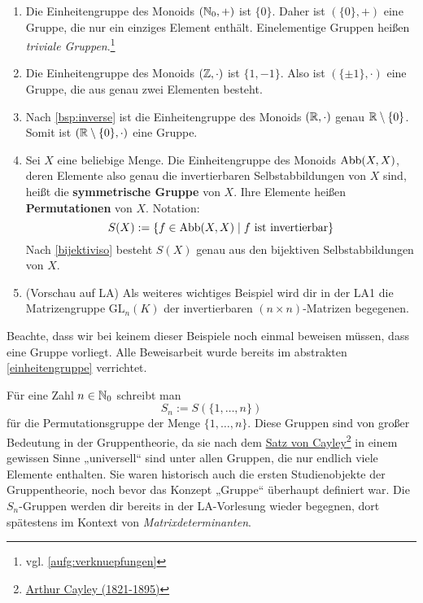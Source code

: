 \begin{bsp}   \quad
    \begin{enumerate}
        \item Die Einheitengruppe des Monoids $(\mathbb N_0,+)$ ist $\{0\}$. Daher ist $(\{0\},+)$ eine Gruppe, die nur ein einziges Element enthält. Einelementige Gruppen heißen \emph{triviale Gruppen}.\footnote{vgl. \cref{aufg:verknuepfungen}}
        \item Die Einheitengruppe des Monoids $(\mathbb Z,\cdot)$ ist $\{1,-1\}$. Also ist $(\{\pm 1\},\cdot)$ eine Gruppe, die aus genau zwei Elementen besteht.
        \item Nach \cref{bsp:inverse} ist die Einheitengruppe des Monoids $(\mathbb R,\cdot)$ genau $\mathbb R\setminus \{0\}$. Somit ist $(\mathbb R\setminus \{0\},\cdot)$ eine Gruppe.
        \item Sei $X$ eine beliebige Menge. Die Einheitengruppe des Monoids $\operatorname{Abb}(X,X)$, deren Elemente also genau die invertierbaren Selbstabbildungen von $X$ sind, heißt die \textbf{symmetrische Gruppe} von $X$. Ihre Elemente heißen \textbf{Permutationen} von $X$. Notation:
            \[ S(X) := \{f\in \Abb(X,X)\mid f\ \text{ist invertierbar} \} \]
        Nach \cref{bijektiviso} besteht $S(X)$ genau aus den bijektiven Selbstabbildungen von $X$.
        \item(Vorschau auf LA) Als weiteres wichtiges Beispiel wird dir in der LA1 die Matrizengruppe $\mathrm{GL}_n(K)$ der invertierbaren $(n\times n)$-Matrizen begegenen.
    \end{enumerate}
    Beachte, dass wir bei keinem dieser Beispiele noch einmal beweisen müssen, dass eine Gruppe vorliegt. Alle Beweisarbeit wurde bereits im abstrakten \cref{einheitengruppe} verrichtet.
\end{bsp}


\begin{bem}
    Für eine Zahl $n\in \mathbb N_0$ schreibt man
        \[ S_n := S(\{1,\dots , n\}) \]
    für die Permutationsgruppe der Menge $\{1,\dots , n\}$. Diese Gruppen sind von großer Bedeutung in der Gruppentheorie, da sie nach dem \href{https://de.wikipedia.org/wiki/Satz_von_Cayley}{Satz von Cayley}\footnote{\href{https://de.wikipedia.org/wiki/Arthur_Cayley}{Arthur Cayley (1821-1895)}} in einem gewissen Sinne „universell“ sind unter allen Gruppen, die nur endlich viele Elemente enthalten. Sie waren historisch auch die ersten Studienobjekte der Gruppentheorie, noch bevor das Konzept „Gruppe“ überhaupt definiert war. Die $S_n$-Gruppen werden dir bereits in der LA-Vorlesung wieder begegnen, dort spätestens im Kontext von \emph{Matrixdeterminanten}.
\end{bem}


